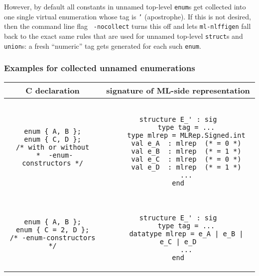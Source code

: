 \documentclass[titlepage,letterpaper]{article}
\newcommand{\gentool}{{\tt ml-nlffigen}}
\begin{document}
However, by default all constants in unnamed top-level {\tt enum}s get
collected into one single virtual enumeration whose tag is {\tt '}
(apostrophe).  If this is not desired, then the command line flag {\tt
  -nocollect} turns this off and lets {\gentool} fall back to the
exact same rules that are used for unnamed top-level {\tt struct}s and
{\tt union}s: a fresh ``numeric'' tag gets generated for each such
{\tt enum}.

\subsubsection*{Examples for collected unnamed enumerations}

\begin{small}
\begin{center}
\begin{tabular}{c|c}
C declaration & signature of ML-side representation \\ \hline\hline
\begin{minipage}{2in}
\begin{verbatim}
enum { A, B };
enum { C, D };
/* with or without
 *  -enum-constructors */
\end{verbatim}
\end{minipage}
&
\begin{minipage}{4in}
\begin{verbatim}

structure E_' : sig
    type tag = ...
    type mlrep = MLRep.Signed.int
    val e_A  : mlrep  (* = 0 *)
    val e_B  : mlrep  (* = 1 *)
    val e_C  : mlrep  (* = 0 *)
    val e_D  : mlrep  (* = 1 *)
    ...
end

\end{verbatim}
\end{minipage}
\\ \hline
\begin{minipage}{2in}
\begin{verbatim}
enum { A, B };
enum { C = 2, D };
/* -enum-constructors */
\end{verbatim}
\end{minipage}
&
\begin{minipage}{4in}
\begin{verbatim}

structure E_' : sig
    type tag = ...
    datatype mlrep = e_A | e_B | e_C | e_D
    ...
end

\end{verbatim}
\end{minipage}
\end{tabular}
\end{center}
\end{small}

%

%
\end{document}
